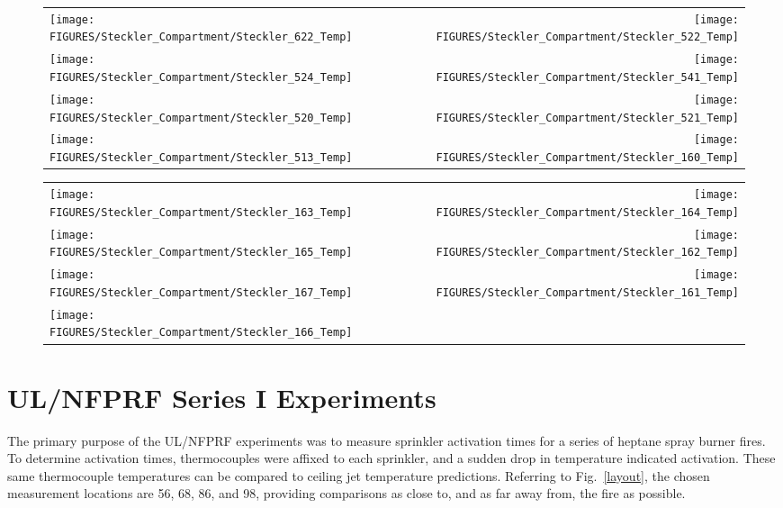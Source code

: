 \begin{figure}[p]
\begin{tabular*}{\textwidth}{l@{\extracolsep{\fill}}r}
\texttt{[image: FIGURES/Steckler\_Compartment/Steckler\_622\_Temp]} &
\texttt{[image: FIGURES/Steckler\_Compartment/Steckler\_522\_Temp]} \\
 \texttt{[image: FIGURES/Steckler\_Compartment/Steckler\_524\_Temp]} &
\texttt{[image: FIGURES/Steckler\_Compartment/Steckler\_541\_Temp]} \\
\texttt{[image: FIGURES/Steckler\_Compartment/Steckler\_520\_Temp]} &
\texttt{[image: FIGURES/Steckler\_Compartment/Steckler\_521\_Temp]} \\
\texttt{[image: FIGURES/Steckler\_Compartment/Steckler\_513\_Temp]} &
\texttt{[image: FIGURES/Steckler\_Compartment/Steckler\_160\_Temp]}
\end{tabular*}
\label{Steckler_Temp_6}
\end{figure}

\begin{figure}[p]
\begin{tabular*}{\textwidth}{l@{\extracolsep{\fill}}r}
\texttt{[image: FIGURES/Steckler\_Compartment/Steckler\_163\_Temp]} &
\texttt{[image: FIGURES/Steckler\_Compartment/Steckler\_164\_Temp]} \\
\texttt{[image: FIGURES/Steckler\_Compartment/Steckler\_165\_Temp]} &
\texttt{[image: FIGURES/Steckler\_Compartment/Steckler\_162\_Temp]} \\
\texttt{[image: FIGURES/Steckler\_Compartment/Steckler\_167\_Temp]} &
\texttt{[image: FIGURES/Steckler\_Compartment/Steckler\_161\_Temp]} \\
\texttt{[image: FIGURES/Steckler\_Compartment/Steckler\_166\_Temp]} &
\end{tabular*}
\label{Steckler_Temp_7}
\end{figure}

\clearpage

\section{UL/NFPRF Series I Experiments}

The primary purpose of the UL/NFPRF experiments was to measure sprinkler activation times for a series of heptane spray burner fires. To determine activation times, thermocouples were affixed to each sprinkler, and a sudden drop in temperature indicated activation. These same thermocouple temperatures can be compared to ceiling jet temperature predictions. Referring to Fig.~\ref{layout}, the chosen measurement locations are 56, 68, 86, and 98, providing comparisons as close to, and as far away from, the fire as possible.



